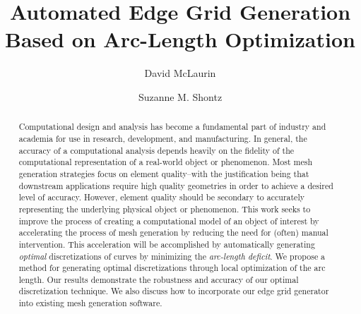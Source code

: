 \documentclass{svmult}
\begin{document}
\title*{Automated Edge Grid Generation Based on Arc-Length Optimization}
\author{David McLaurin\and
Suzanne M. Shontz}
%
%
\maketitle

\begin{abstract}
Computational design and analysis has become a fundamental part of 
industry and academia for use in research, development, and manufacturing.  
In general, the accuracy of a computational analysis depends heavily on 
the fidelity of the computational representation of a real-world object or 
phenomenon. Most mesh generation strategies focus on element quality--with 
the justification being that downstream applications require high quality 
geometries in order to achieve a desired level of accuracy. However, 
element quality should be secondary to accurately representing the 
underlying physical object or phenomenon.  This work seeks to improve the 
process of creating a computational model of an object of interest by 
accelerating the process of mesh generation by reducing the need for 
(often) manual intervention. This acceleration will be accomplished by 
automatically generating \textit{optimal} discretizations of curves by 
minimizing the \textit{arc-length deficit}.  We propose a method for
generating optimal discretizations through local optimization of the 
arc length.  Our results demonstrate the robustness and accuracy of
our optimal discretization technique.  We also discuss how to incorporate 
our edge grid generator into existing mesh generation software.
\end{abstract}
\end{document}
